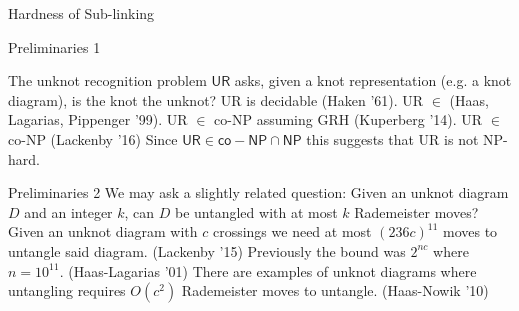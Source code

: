 \documentclass{beamer}
\begin{document}
\begin{section}{Hardness of Sub-linking}
    
\begin{frame}{Preliminaries 1}
        
        The unknot recognition problem $\mathsf{UR}$ asks, given a knot representation (e.g. a knot diagram), is the knot the unknot?
        \newline
        \newline
        UR is decidable (Haken '61).
        \newline
        UR $\in$  (Haas, Lagarias, Pippenger '99).
        \newline
        UR $\in$ co-NP assuming GRH (Kuperberg '14).
        \newline
        UR $\in$ co-NP (Lackenby '16)
        \newline
        \newline
        Since $\mathsf{UR}\in \mathsf{co-NP} \cap \mathsf{NP}$ this suggests that UR is not NP-hard. 
        
\end{frame}
    
\begin{frame}{Preliminaries 2}
        We may ask a slightly related question: Given an unknot diagram $D$ and an integer $k$, can $D$ be untangled with at most $k$ Rademeister moves?
        \newline
        \newline
        Given an unknot diagram with $c$ crossings we need at most $(236c)^{11}$ moves to untangle said diagram. (Lackenby '15)
        \newline
        \newline
        Previously the bound was $2^{nc}$ where $n=10^{11}$. (Haas-Lagarias '01)
        \newline
        \newline
        There are examples of unknot diagrams where untangling requires $O(c^2)$ Rademeister moves to untangle. (Haas-Nowik '10)
        
\end{frame}
    

\end{section}
\end{document}
